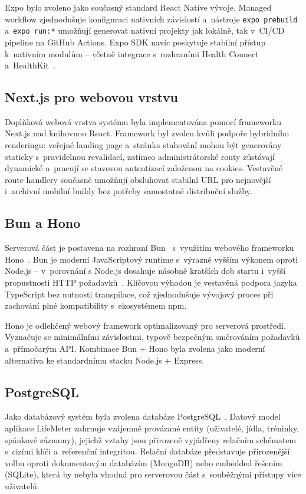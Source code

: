 Expo bylo zvoleno jako současný standard React Native vývoje. Managed workflow
zjednodušuje konfiguraci nativních závislostí a~nástroje
\texttt{expo prebuild} a~\texttt{expo run:*} umožňují generovat nativní
projekty jak lokálně, tak v~CI/CD pipeline na GitHub Actions. Expo SDK
navíc poskytuje stabilní přístup k~nativním modulům -- včetně integrace
s~rozhraními Health Connect~\cite{healthconnect2024} a~HealthKit~\cite{healthkit2024}.

\subsection{Next.js pro webovou vrstvu}

Doplňková webová vrstva systému byla implementována pomocí frameworku
Next.js nad knihovnou React. Framework byl zvolen kvůli podpoře
hybridního renderingu: veřejné landing page a~stránka stahování mohou
být generovány staticky s~pravidelnou revalidací, zatímco administrátorské
routy zůstávají dynamické a~pracují se stavovou autentizací založenou
na cookies. Vestavěné route handlery současně umožňují obsluhovat
stabilní URL pro nejnovější i~archivní mobilní buildy bez potřeby
samostatné distribuční služby.

\subsection{Bun a Hono}

Serverová část je postavena na rozhraní Bun~\cite{bun} s~využitím
webového frameworku Hono~\cite{hono2024}. Bun je moderní JavaScriptový runtime
s~výrazně vyšším výkonem oproti Node.js -- v~porovnání s Node.js dosahuje násobně
kratších dob startu i~vyšší propustnosti HTTP požadavků~\cite{bunvsnode2025}. Klíčovou
výhodou je vestavěná podpora jazyka TypeScript bez nutnosti transpilace, což
zjednodušuje vývojový proces při zachování plné kompatibility s~ekosystémem npm.

Hono je odlehčený webový framework optimalizovaný pro serverová prostředí.
Vyznačuje se minimálními závislostmi, typově bezpečným směrováním požadavků
a~přímočarým API. Kombinace Bun + Hono byla zvolena jako moderní alternativa
ke standardnímu stacku Node.js + Express.

\subsection{PostgreSQL}

Jako databázový systém byla zvolena databáze PostgreSQL~\cite{postgresql2024}.
Datový model aplikace LifeMeter zahrnuje vzájemně provázané entity (uživatelé,
jídla, tréninky, spánkové záznamy), jejichž vztahy jsou přirozeně vyjádřeny
relačním schématem s~cizími klíči a~referenční integritou. Relační databáze
představuje přirozenější volbu oproti dokumentovým databázím (MongoDB) nebo
embedded řešením (SQLite), která by nebyla vhodná pro serverovou část
s~souběžnými přístupy více uživatelů.

